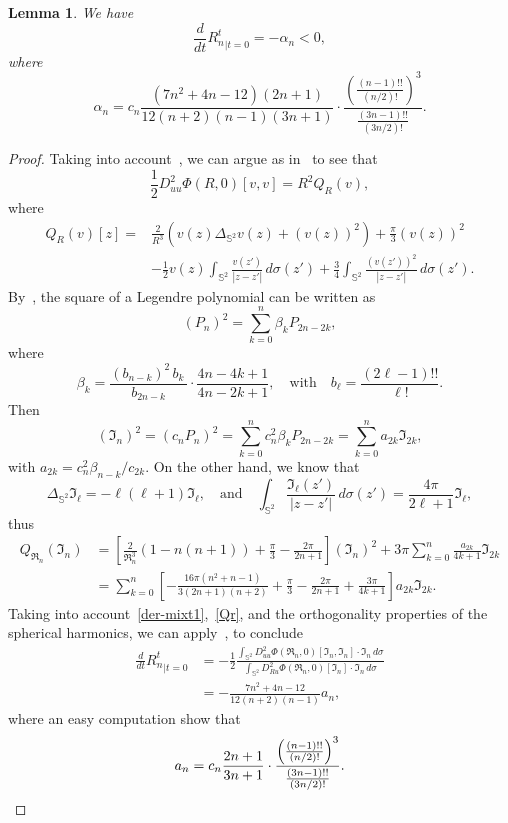 \documentclass[10pt,reqno,english]{amsart}
\newcommand{\Sd}{\mathbb{S}^2}
\newcommand{\rn}{{\mathfrak R}_n  }
\newtheorem{lemma}{Lemma}[section]
\theoremstyle{definition}
\numberwithin{equation}{section}
\begin{document}
\begin{lemma}
\label{lemma:derRaggio}
We have
\[
\frac{d}{dt}{R_n^t}_{|t=0}=-\alpha_n<0,
\]
where
\begin{equation}
\label{alphan}
\alpha_n=c_n\frac{(7n^2+4n-12)(2n+1)}{12(n+2)(n-1)(3n+1)}\cdot\frac{ \left( \frac{(n-1)!!}{(n/2)!} \right)^3 }{ \frac{(3n-1)!!}{(3n/2)!} }.
\end{equation}
\end{lemma}
\begin{proof}
Taking into account~\cite[Lemmas 14, 15]{Fr19}, we can argue as in~\cite[Proposition 10]{Fr19} to see that
\[
\frac12 D^2_{uu}\Phi(R,0)[v,v]=R^2 Q_R(v),
\]
where
\begin{align*}
Q_R(v)[z]=&\frac{2}{R^3}\left(v(z)\Delta_{\Sd}v(z)+(v(z))^2\right)+\frac{\pi}{3}(v(z))^2\\
&-\frac12v(z)\int_{\Sd}\frac{v(z')}{|z-z'|}\,d\sigma(z')+\frac34\int_{\Sd}\frac{(v(z'))^2}{|z-z'|}\,d\sigma(z').
\end{align*}
By~\cite[Formula 8.915.5 page 986]{GRbook}, the square of a Legendre polynomial can be written as
\[
(P_n)^2 = \sum_{k=0}^{n} \beta_k  P_{2n-2k},
\]
where
\[
\beta_k = \frac{(b_{n-k})^2 \, b_k \, }{b_{2n - k}} \cdot \frac{4n - 4k + 1}{4n - 2k + 1},\quad\text{with}\quad b_\ell = \frac{(2\ell-1)!!}{\ell!}.
\]
Then
\[
(\mathfrak I_n)^2=(c_n P_n)^2=\sum_{k=0}^{n} c_n^2\beta_k  P_{2n-2k}=\sum_{k=0}^{n}a_{2k}\mathfrak I_{2k},
\]
with $a_{2k}=c_n^2\beta_{n-k}/c_{2k}$.
On the other hand, we know that
\[
\Delta_{\Sd}\mathfrak I_\ell=-\ell(\ell+1)\mathfrak I_\ell,\quad\text{and}\quad\int_{\Sd}\frac{\mathfrak I_\ell(z')}{|z-z'|}\,d\sigma(z')=\frac{4\pi}{2\ell+1}\mathfrak I_\ell,
\]
thus
\begin{equation}
\label{Qr}
\begin{split}
Q_{\rn}(\mathfrak I_n)&=\left[\frac{2}{\rn^3}(1-n(n+1))+\frac\pi3-\frac{2\pi}{2n+1}\right](\mathfrak I_n)^2+3\pi\sum_{k=0}^n\frac{a_{2k}}{4k+1}\mathfrak I_{2k}\\
&=\sum_{k=0}^n\left[-\frac{16\pi(n^2+n-1)}{3(2n+1)(n+2)}+\frac\pi3-\frac{2\pi}{2n+1}+\frac{3\pi}{4k+1}\right]a_{2k}\mathfrak I_{2k}.
\end{split}
\end{equation}
Taking into account~\eqref{der-mixt1},~\eqref{Qr}, and the orthogonality properties of the spherical harmonics, we can apply~\cite[formula (I.6.3)]{KieBook}, to conclude
\begin{align*}
\frac{d}{dt}{R_n^t}_{|t=0}&=-\frac12\frac{\int_{\Sd} D^2_{uu}\Phi(\rn,0)[\mathfrak I_n,\mathfrak I_n]\cdot\mathfrak I_n\,d\sigma}{\int_{\Sd} D^2_{Ru}\Phi(\rn,0)[\mathfrak I_n]\cdot\mathfrak I_n\,d\sigma}\\
&=-\frac{7n^2+4n-12}{12(n+2)(n-1)}a_n,
\end{align*}
where an easy computation show that
\[
a_n=c_n\frac{2n + 1}{3n + 1}\cdot\frac{ \left( \frac{(n-1)!!}{(n/2)!} \right)^3 }{ \frac{(3n-1)!!}{(3n/2)!} }.\qedhere
\]
\end{proof}
\end{document}
